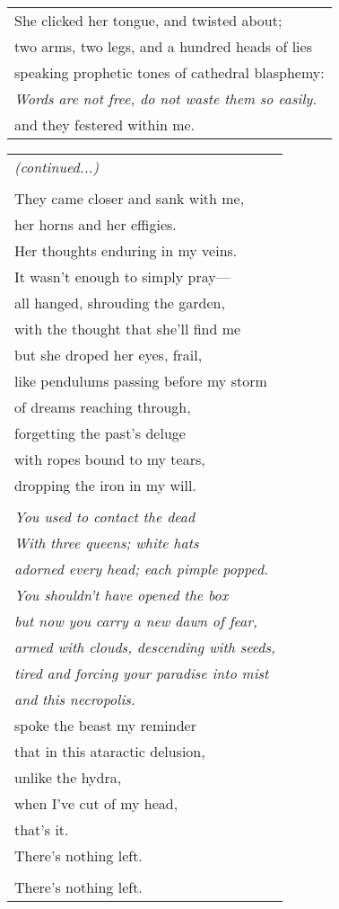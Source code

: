 \documentclass{article}
\begin{document}
\begin{center}
\begin{tabular}{l}
\\
She clicked her tongue, and twisted about; \\
two arms, two legs, and a hundred heads of lies \\
speaking prophetic tones of cathedral blasphemy: \\
\textit{Words are not free, do not waste them so easily.} \\
and they festered within me. \\
\end{tabular}
\begin{tabular}{l}
{\footnotesize \textit{(continued...)}} \\
\\
They came closer and sank with me, \\
her horns and her effigies. \\
Her thoughts enduring in my veins. \\
It wasn't enough to simply pray--- \\
all hanged, shrouding the garden, \\
with the thought that she'll find me \\
but she droped her eyes, frail, \\
like pendulums passing before my storm \\
of dreams reaching through, \\
forgetting the past's deluge \\
with ropes bound to my tears, \\
dropping the iron in my will. \\
\\
\textit{You used to contact the dead} \\
\textit{With three queens; white hats} \\
\textit{adorned every head; each pimple popped.} \\
\textit{You shouldn't have opened the box} \\
\textit{but now you carry a new dawn of fear,} \\
\textit{armed with clouds, descending with seeds,} \\
\textit{tired and forcing your paradise into mist} \\
\textit{and this necropolis.} \\
spoke the beast my reminder \\
that in this ataractic delusion, \\
unlike the hydra, \\
when I've cut of my head, \\
that's it. \\
There's nothing left. \\
\\
There's nothing left. \\
\end{tabular}
\end{center}
\end{document}
